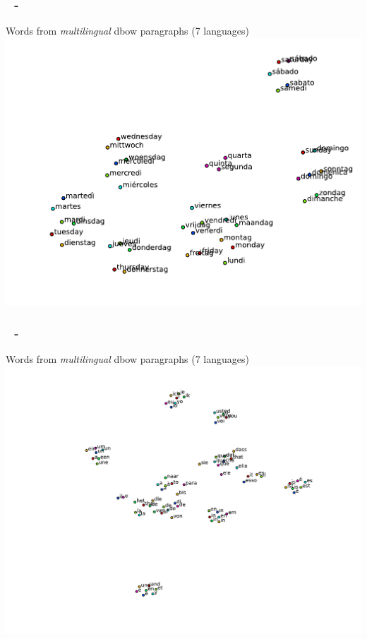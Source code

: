 \documentclass{beamer}
\newenvironment{dia}
{
\begin{frame}[fragile, environment=dia]
\frametitle{\insertsection
\ifx\insertsubsection\empty\else
      \,~-~\insertsubsection             %
   \fi}
}
{
\end{frame}
}
\begin{document}
\begin{dia}
Words from \emph{multilingual} dbow paragraphs (7 languages)
\includegraphics[width=1\linewidth]{figures/weekdays7}
\end{dia}

\begin{dia}
Words from \emph{multilingual} dbow paragraphs (7 languages)
\includegraphics[width=1\linewidth]{figures/en10freq7}
\end{dia}
\end{document}
